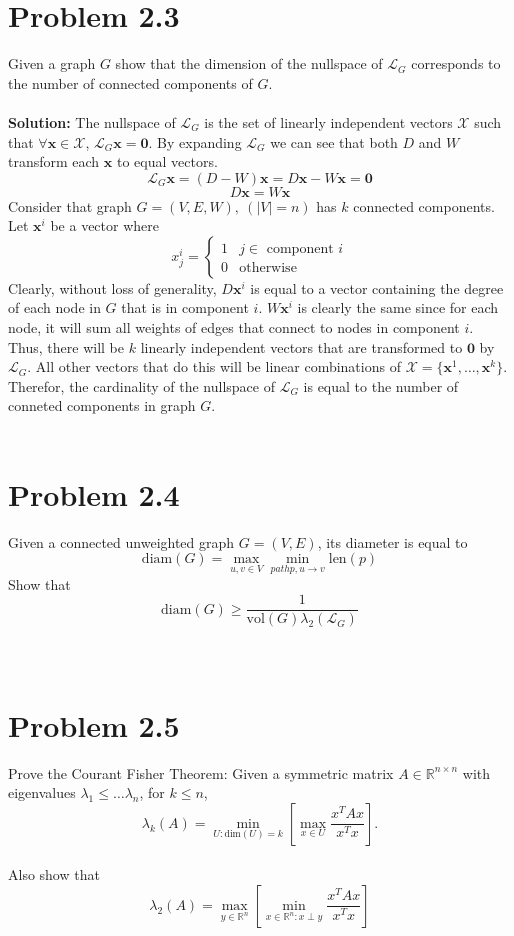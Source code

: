 \documentclass{amsart}
\begin{document}
	\section{Problem  2.3}
	Given a graph $G$ show that the dimension of the nullspace of $\mathcal{L}_G$ corresponds to the number of connected components of $G$.
	\\\\
	\textbf{Solution:} The nullspace of $\mathcal{L}_G$ is the set of linearly independent vectors $\mathcal{X}$ such that $\forall \mathbf{x} \in \mathcal{X}$, $\mathcal{L}_G\mathbf{x} = \mathbf{0}$.
	By expanding $\mathcal{L}_G$ we can see that both $D$ and $W$ transform each $\mathbf{x}$ to equal vectors.
	\[
	\mathcal{L}_G \mathbf{x} = (D - W)\mathbf{x} = D\mathbf{x} - W\mathbf{x} = \mathbf{0}
	\]
	\[
	D\mathbf{x} = W\mathbf{x}
	\]
	Consider that graph $G = (V,E,W),~(|V|=n)$ has $k$ connected components. Let $\mathbf{x}^i$ be a vector where
	\[
	x^i_j = 
	\begin{cases}
		1 & j \in \text{ component } i\\
		0 & \text{otherwise} 
	\end{cases}
	\]
	Clearly, without loss of generality, $D\mathbf{x}^i$ is equal to a vector containing the degree of each node in $G$ that is in component $i$. $W\mathbf{x}^i$ is clearly the same since for each node, it will sum all weights of edges that connect to nodes in component $i$. Thus, there will be $k$ linearly independent vectors that are transformed to $\mathbf{0}$ by $\mathcal{L}_G$. All other vectors that do this will be linear combinations of $\mathcal{X} = \{\mathbf{x}^1,\dots ,\mathbf{x}^k\}$. Therefor, the cardinality of the nullspace of $\mathcal{L}_G$ is equal to the number of conneted components in graph $G$.
	\\\\
	\section{Problem 2.4}
	Given a connected unweighted graph $G = (V,E)$, its diameter is equal to 
	\[
	\text{diam}(G) = \max_{u,v\in V} \min_{path p, u\rightarrow v} \text{len}(p)
	\]
	Show that 
	\[
	\text{diam}(G) \ge \frac{1}{\text{vol}(G)\lambda_2(\mathcal{L}_G)}
	\]
	\\\\
	\section{Problem 2.5}
	Prove the Courant Fisher Theorem: Given a symmetric matrix $A\in \mathbb{R}^{n\times n}$ with eigenvalues $\lambda_1 \le \dots \lambda_n$, for $k \le n$,
	\[
	\lambda_k(A) = \min_{U:\text{dim}(U)=k} \left[ \max_{x\in U} \frac{x^TAx}{x^Tx} \right].
	\]
	\\
	Also show that
	\[
	\lambda_2(A) = \max_{y\in\mathbb{R}^n} \left[ \min_{x\in\mathbb{R}^n:x\perp y} \frac{x^TAx}{x^Tx} \right]
	\]
	\\\\
\end{document}

